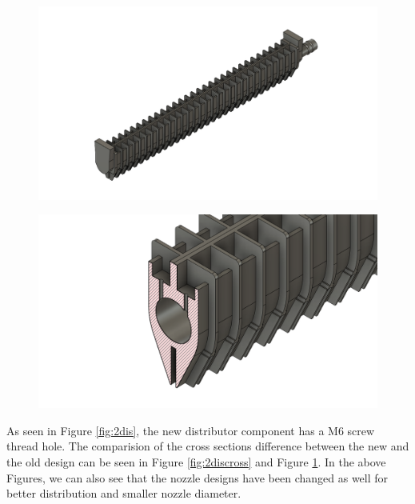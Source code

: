 \begin{itemize}
    
    \begin{figure}[H]
        \centering
        \begin{minipage}{.5\textwidth}
        \centering
        \includegraphics[width=\linewidth]{images/mywork/Sprint4/Distributor_old.png}
         \label{fig:1dis}
    \end{minipage}%
    \begin{minipage}{.5\textwidth}
        \centering
        \includegraphics[width=\linewidth]{images/mywork/Sprint4/olddiscross.png}
        \label{fig:1discross}
    \end{minipage}
    \end{figure}
    
    
    As seen in Figure \ref{fig:2dis}, the new distributor component has a M6 screw thread hole. The comparision of the cross sections difference between the new and the old design can be seen in Figure \ref{fig:2discross} and Figure \ref{fig:1discross}. In the above Figures, we can also see that the nozzle designs have been changed as well for better distribution and smaller nozzle diameter. 
    
\end{itemize}

